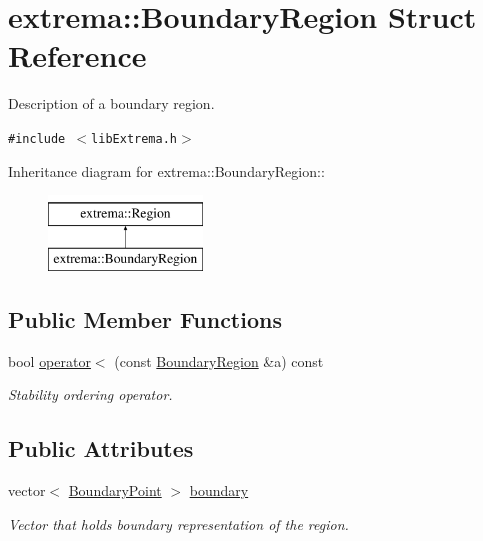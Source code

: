 \hypertarget{structextrema_1_1BoundaryRegion}{
\section{extrema::Boundary\-Region Struct Reference}
\label{structextrema_1_1BoundaryRegion}
}
Description of a boundary region.  


{\tt \#include $<$lib\-Extrema.h$>$}

Inheritance diagram for extrema::Boundary\-Region::\begin{figure}[H]
\begin{center}
\leavevmode
\includegraphics[height=2cm]{structextrema_1_1BoundaryRegion}
\end{center}
\end{figure}
\subsection*{Public Member Functions}
\begin{CompactItemize}
\item 
bool \hyperlink{structextrema_1_1BoundaryRegion_db707294ab50792ab4c4c1c418337f4e}{operator$<$} (const \hyperlink{structextrema_1_1BoundaryRegion}{Boundary\-Region} \&a) const 
\begin{CompactList}\small\item\em Stability ordering operator. \item\end{CompactList}\end{CompactItemize}
\subsection*{Public Attributes}
\begin{CompactItemize}
\item 
vector$<$ \hyperlink{structextrema_1_1BoundaryPoint}{Boundary\-Point} $>$ \hyperlink{structextrema_1_1BoundaryRegion_ead102bfcfdc1d8907632b71edd2f6e6}{boundary}
\begin{CompactList}\small\item\em Vector that holds boundary representation of the region. \item\end{CompactList}\end{CompactItemize}


